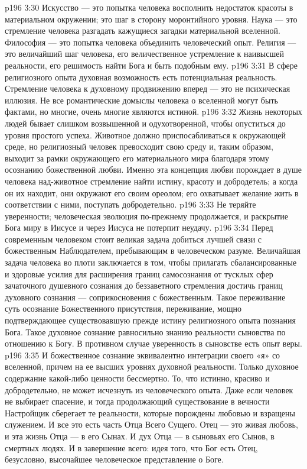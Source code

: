 \vs p196 3:30 \pc Искусство --- это попытка человека восполнить недостаток красоты в материальном окружении; это шаг в сторону моронтийного уровня. Наука --- это стремление человека разгадать кажущиеся загадки материальной вселенной. Философия --- это попытка человека объединить человеческий опыт. Религия --- это величайший шаг человека, его величественное устремление к наивысшей реальности, его решимость найти Бога и быть подобным ему.
\vs p196 3:31 \pc В сфере религиозного опыта духовная возможность есть потенциальная реальность. Стремление человека к духовному продвижению вперед --- это не психическая иллюзия. Не все романтические домыслы человека о вселенной могут быть фактами, но многие, очень многие являются истиной.
\vs p196 3:32 Жизнь некоторых людей бывает слишком возвышенной и одухотворенной, чтобы опуститься до уровня простого успеха. Животное должно приспосабливаться к окружающей среде, но религиозный человек превосходит свою среду и, таким образом, выходит за рамки окружающего его материального мира благодаря этому осознанию божественной любви. Именно эта концепция любви порождает в душе человека над\hyp{}животное стремление найти истину, красоту и добродетель; а когда он их находит, они окружают его своим ореолом; его охватывает желание жить в соответствии с ними, поступать добродетельно.
\vs p196 3:33 Не теряйте уверенности; человеческая эволюция по\hyp{}прежнему продолжается, и раскрытие Бога миру в Иисусе и через Иисуса не потерпит неудачу.
\vs p196 3:34 Перед современным человеком стоит великая задача добиться лучшей связи с божественным Наблюдателем, пребывающим в человеческом разуме. Величайшая задача человека во плоти заключается в том, чтобы прилагать сбалансированные и здоровые усилия для расширения границ самосознания от тусклых сфер зачаточного душевного сознания до беззаветного стремления достичь границ духовного сознания --- соприкосновения с божественным. Такое переживание суть осознание Божественного присутствия, переживание, мощно подтверждающее существовавшую прежде истину религиозного опыта познания Бога. Такое духовное сознание равносильно знанию реальности сыновства по отношению к Богу. В противном случае уверенность в сыновстве есть опыт веры.
\vs p196 3:35 И божественное сознание эквивалентно интеграции своего «я» со вселенной, причем на ее высших уровнях духовной реальности. Только духовное содержание какой\hyp{}либо ценности бессмертно. То, что истинно, красиво и добродетельно, не может исчезнуть из человеческого опыта. Даже если человек не выбирает спасение, и тогда продолжающий существование в вечности Настройщик сберегает те реальности, которые порождены любовью и взращены служением. И все это есть часть Отца Всего Сущего. Отец --- это живая любовь, и эта жизнь Отца --- в его Сынах. И дух Отца --- в сыновьях его Сынов, в смертных людях. И в завершение всего: идея того, что Бог есть Отец, безусловно, высочайшее человеческое представление о Боге.
\separatorline
